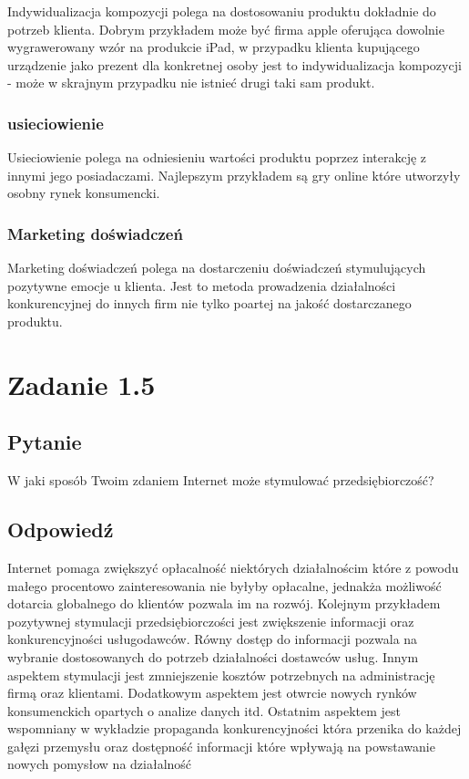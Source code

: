 \documentclass[paper=a4, fontsize=11pt]{scrartcl} %
\numberwithin{equation}{section} %
\numberwithin{figure}{section} %
\numberwithin{table}{section} %
\begin{document}
Indywidualizacja kompozycji polega na dostosowaniu produktu dokładnie do potrzeb klienta. Dobrym przykładem może być firma apple oferująca dowolnie wygrawerowany wzór na produkcie iPad,
w przypadku klienta kupującego urządzenie jako prezent dla konkretnej osoby jest to indywidualizacja kompozycji - może w skrajnym przypadku nie istnieć drugi taki sam produkt.

\subsubsection {usieciowienie}

Usieciowienie polega na odniesieniu wartości produktu poprzez interakcję z innymi jego posiadaczami.
Najlepszym przykładem są gry online które utworzyły osobny rynek konsumencki.

\subsubsection {Marketing doświadczeń}

Marketing doświadczeń polega na dostarczeniu doświadczeń stymulujących pozytywne emocje u klienta. Jest to metoda prowadzenia działalności konkurencyjnej do innych firm nie tylko poartej na jakość 
dostarczanego produktu. 

\section{Zadanie 1.5}

\subsection {Pytanie}

W jaki sposób Twoim zdaniem Internet może stymulować przedsiębiorczość?

\subsection  {Odpowiedź}

Internet pomaga zwiększyć opłacalność niektórych działalnościm które z powodu małego procentowo zainteresowania nie byłyby opłacalne, jednakża możliwość dotarcia globalnego do klientów pozwala im
na rozwój. Kolejnym przykładem pozytywnej stymulacji przedsiębiorczości jest zwiększenie informacji oraz konkurencyjności usługodawców. Równy dostęp do informacji pozwala na wybranie dostosowanych
do potrzeb działalności dostawców usług. Innym aspektem stymulacji jest zmniejszenie kosztów potrzebnych na administrację firmą oraz klientami.
Dodatkowym aspektem jest otwrcie nowych rynków konsumenckich opartych o analize danych itd.
Ostatnim aspektem jest wspomniany w wykładzie propaganda konkurencyjności która przenika do każdej gałęzi przemysłu oraz dostępność informacji które wpływają na powstawanie nowych pomysłow na 
działalność
\end{document}
